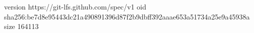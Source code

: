 version https://git-lfs.github.com/spec/v1
oid sha256:be7d8e95443dc21a490891396d87f2b9dbff392aaae653a51734a25e9a45938a
size 164113
